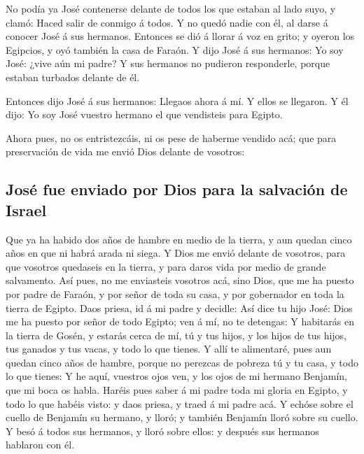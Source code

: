  No podía ya José contenerse delante de todos los que
estaban al lado suyo, y clamó: Haced salir de conmigo á todos. Y no
quedó nadie con él, al darse á conocer José á sus hermanos. 
Entonces se dió á llorar á voz en grito; y oyeron los Egipcios, y oyó
también la casa de Faraón.  Y dijo José á sus hermanos: Yo
soy José: ¿vive aún mi padre? Y sus hermanos no pudieron responderle,
porque estaban turbados delante de él.

 Entonces dijo José á sus hermanos: Llegaos ahora á mí. Y
ellos se llegaron. Y él dijo: Yo soy José vuestro hermano el que
vendisteis para Egipto.

 Ahora pues, no os entristezcáis, ni os pese de haberme
vendido acá; que para preservación de vida me envió Dios delante de
vosotros:

\hypertarget{josuxe9-fue-enviado-por-dios-para-la-salvaciuxf3n-de-israel}{%
\subsection{José fue enviado por Dios para la salvación de
Israel}\label{josuxe9-fue-enviado-por-dios-para-la-salvaciuxf3n-de-israel}}

 Que ya ha habido dos años de hambre en medio de la tierra,
y aun quedan cinco años en que ni habrá arada ni siega.  Y
Dios me envió delante de vosotros, para que vosotros quedaseis en la
tierra, y para daros vida por medio de grande salvamento. 
Así pues, no me enviasteis vosotros acá, sino Dios, que me ha puesto por
padre de Faraón, y por señor de toda su casa, y por gobernador en toda
la tierra de Egipto.  Daos priesa, id á mi padre y decidle:
Así dice tu hijo José: Dios me ha puesto por señor de todo Egipto; ven á
mí, no te detengas:  Y habitarás en la tierra de Gosén, y
estarás cerca de mí, tú y tus hijos, y los hijos de tus hijos, tus
ganados y tus vacas, y todo lo que tienes.  Y allí te
alimentaré, pues aun quedan cinco años de hambre, porque no perezcas de
pobreza tú y tu casa, y todo lo que tienes:  Y he aquí,
vuestros ojos ven, y los ojos de mi hermano Benjamín, que mi boca os
habla.  Haréis pues saber á mi padre toda mi gloria en
Egipto, y todo lo que habéis visto: y daos priesa, y traed á mi padre
acá.  Y echóse sobre el cuello de Benjamín su hermano, y
lloró; y también Benjamín lloró sobre su cuello.  Y besó á
todos sus hermanos, y lloró sobre ellos: y después sus hermanos hablaron
con él.


